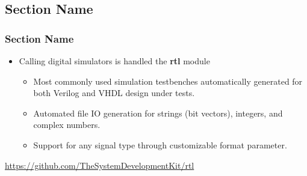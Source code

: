 \documentclass{sdkslides}
\newcommand{\sectname}{Section Name}
\begin{document}
\subsection*{\sectname}
\begin{frame}[t]
    \frametitle{\sectname}
    \begin{itemize}
        \item Calling digital simulators is handled the \textbf{rtl} module
        \begin{itemize}
            \item Most commonly used simulation testbenches automatically
                generated for both Verilog and VHDL design under tests.
            \item Automated file IO generation for strings (bit vectors), integers, and complex numbers. 
            \item Support for any signal type through customizable format
                parameter.
        \end{itemize}
    \end{itemize}
    {\tiny   \url{https://github.com/TheSystemDevelopmentKit/rtl}}
\end{frame}

\renewcommand{\sectionname}{EM field simulator interface}
\end{document}
